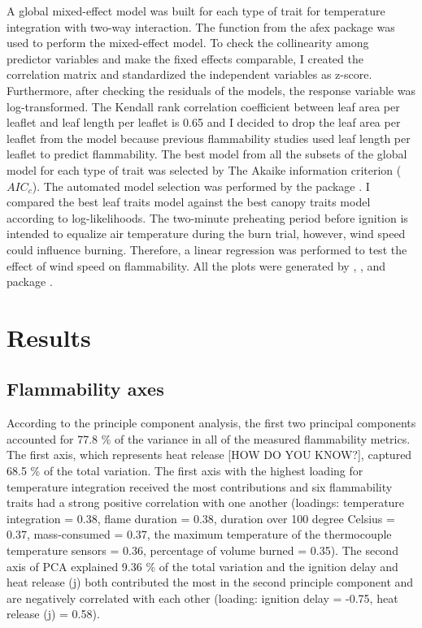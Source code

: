 \documentclass[12pt]{report}
\begin{document}
A global mixed-effect model was built for each type of trait for temperature integration with two-way interaction. The  function from the afex package \citep{singmann2015packageafex,afexluke2017evaluating} was used to perform the mixed-effect model. To check the collinearity among predictor variables and make the fixed effects comparable, I created the correlation matrix and standardized the independent variables as z-score. Furthermore, after checking the residuals of the models, the response variable was log-transformed. The Kendall rank correlation coefficient between leaf area per leaflet and leaf length per leaflet is 0.65 and I decided to drop the leaf area per leaflet from the model because previous flammability studies used leaf length per leaflet to predict flammability. The best model from all the subsets of the global model for each type of trait was selected by The Akaike information criterion ($AIC_{c}$). The automated model selection was performed by the  package \citep{barton2015packagemumin}. I compared the best leaf traits model against the best canopy traits model according to log-likelihoods. The two-minute preheating period before ignition is intended to equalize air temperature during the burn trial, however, wind speed could influence burning. Therefore, a linear regression was performed to test the effect of wind speed on flammability. All the plots were generated by , , and  package \citep{wickham2016packageggplot2, kassambara2017packagefactoextra,kassambara2020package}.\\


\section{Results}

\subsection{Flammability axes}
According to the principle component analysis, the first two principal components accounted for 77.8 \% of   the variance in all of the measured flammability metrics. The first axis, which represents heat release [HOW DO YOU KNOW?], captured 68.5 \% of the total variation. The first axis with the highest loading for temperature integration received the most contributions and six flammability traits had a strong positive correlation with one another (loadings: temperature integration = 0.38, flame duration = 0.38, duration over 100 degree Celsius = 0.37, mass-consumed = 0.37, the maximum temperature of the thermocouple temperature sensors = 0.36, percentage of volume burned = 0.35). The second axis of PCA explained 9.36 \% of the total variation and the ignition delay and heat release (j) both contributed the most in the second principle component and are negatively correlated with each other (loading: ignition delay = -0.75, heat release (j) = 0.58).
\end{document}

